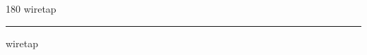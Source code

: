 
\begin{frame}
\begin{center}
\begin{turn}{180}
{\fontsize{2.5cm}{1em}\selectfont wiretap}
\end{turn}
\vspace{1em}\par  
\hrule
\vspace{1em}\par  
{\fontsize{2.5cm}{1em}\selectfont wiretap}
\end{center}
\end{frame}
